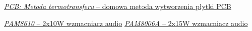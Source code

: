 \documentclass[polish]{aghengthesis}
\begin{document}
\begin{thebibliography}{9}
		\href{http://mikrokontrolery.blogspot.com/2011/03/wykonanie-plytki-pcb-metoda-termotransferu.html}{\textit{PCB: Metoda termotransferu} -- domowa metoda wytworzenia płytki PCB}
		
		\href{https://www.diodes.com/assets/Datasheets/products_inactive_data/PAM8610.pdf}{\textit{PAM8610} -- 2x10W wzmacniacz audio}
		\href{https://www.diodes.com/assets/Datasheets/PAM8006A.pdf}{\textit{PAM8006A} -- 2x15W wzmacniacz audio}
		
	\end{thebibliography}
	
\end{document}
